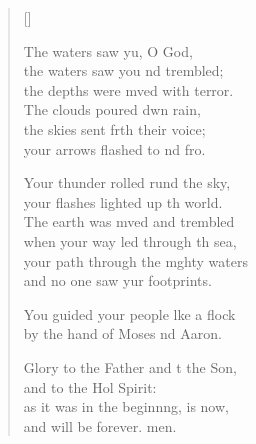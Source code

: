 \begin{verse}[\versewidth]
\begin{patverse}
The waters saw yu, O God,\Med\\
the waters saw you nd trembled;\\
the depths were mved with terror.\Med\\
The clouds poured dwn rain,\\
the skies sent frth their voice;\Med\\
your arrows flashed to nd fro.

Your thunder rolled rund the sky,\Med\\
your flashes lighted up th world.\\
The earth was mved and trembled\Med\\
when your way led through th sea,\\
your path through the m\pointup{\i}ghty waters\Med\\
and no one saw yur footprints.

You guided your people l\pointup{\i}ke a flock\Med\\
by the hand of Moses nd Aaron.

Glory to the Father and t the Son,\Med\\
and to the Hol Spirit:\\
as it was in the beginn\pointup{\i}ng, is now,\Med\\
and will be forever. men.
  \end{patverse}
\end{verse}
